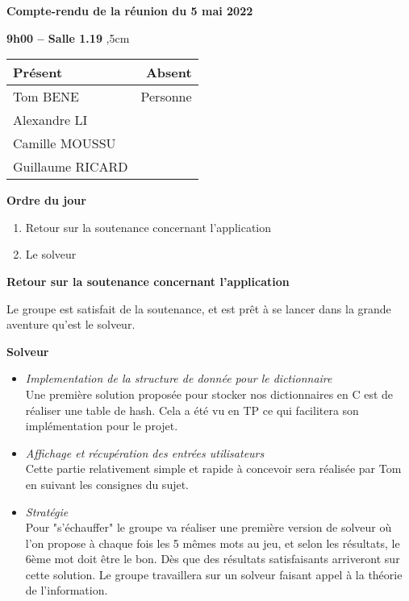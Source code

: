 \documentclass[12pt,a4paper,final]{report}
\begin{document}
\begin{center}
\Large \textbf{Compte-rendu de la réunion du 5 mai 2022}
\end{center}
\textbf{9h00 -- Salle 1.19}
,5cm

\begin{center}
\begin{tabular}{|l|r|}
    \hline
    Présent & Absent \\
    \hline
    Tom BENE & Personne \\
    Alexandre LI & \\
    Camille MOUSSU & \\
    Guillaume RICARD  & \\
    \hline
\end{tabular}
\end{center}

\begin{flushleft}
    \textbf{Ordre du jour}
\end{flushleft}

\begin{enumerate}
	\item Retour sur la soutenance concernant l'application 
	\item Le solveur
\end{enumerate}

\begin{flushleft}
    \textbf{Retour sur la soutenance concernant l'application}
\end{flushleft}

Le groupe est satisfait de la soutenance, et est prêt à se lancer dans la grande aventure qu'est le solveur. 

\begin{flushleft}
    \textbf{Solveur}
\end{flushleft}

\begin{itemize}
    \item \textit{Implementation de la structure de donnée pour le dictionnaire} \\
    Une première solution proposée pour stocker nos dictionnaires en C est de réaliser une table de hash. Cela a été vu en TP ce qui facilitera son implémentation pour le projet.
    \item \textit{Affichage et récupération des entrées utilisateurs} \\
    Cette partie relativement simple et rapide à concevoir sera réalisée par Tom en suivant les consignes du sujet.
    \item \textit{Stratégie} \\
    Pour "s'échauffer" le groupe va réaliser une première version de solveur où l'on propose à chaque fois les 5 mêmes mots au jeu, et selon les résultats, le 6ème mot doit être le bon. 
    Dès que des résultats satisfaisants arriveront sur cette solution. Le groupe travaillera sur un solveur faisant appel à la théorie de l'information.
\end{itemize}
\end{document}
